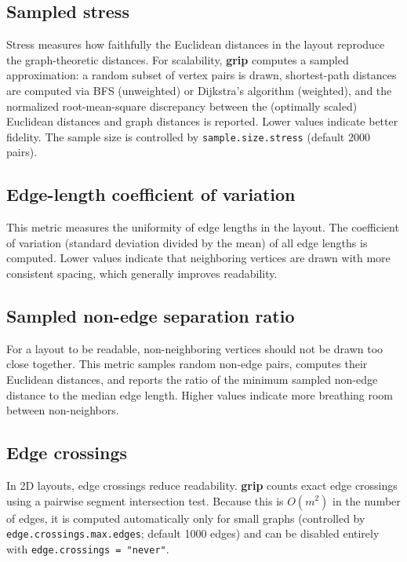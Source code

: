 \subsection{Sampled stress}\label{sampled-stress}

Stress measures how faithfully the Euclidean distances in the layout
reproduce the graph-theoretic distances. For scalability, \textbf{grip} computes a
sampled approximation: a random subset of vertex pairs is drawn, shortest-path
distances are computed via BFS (unweighted) or Dijkstra's algorithm
(weighted), and the normalized root-mean-square discrepancy between the
(optimally scaled) Euclidean distances and graph distances is reported. Lower
values indicate better fidelity. The sample size is controlled by
\texttt{sample.size.stress} (default 2000 pairs).

\subsection{Edge-length coefficient of variation}\label{edge-length-coefficient-of-variation}

This metric measures the uniformity of edge lengths in the layout. The
coefficient of variation (standard deviation divided by the mean) of all edge
lengths is computed. Lower values indicate that neighboring vertices are
drawn with more consistent spacing, which generally improves readability.

\subsection{Sampled non-edge separation ratio}\label{sampled-non-edge-separation-ratio}

For a layout to be readable, non-neighboring vertices should not be drawn
too close together. This metric samples random non-edge pairs, computes
their Euclidean distances, and reports the ratio of the minimum sampled
non-edge distance to the median edge length. Higher values indicate more
breathing room between non-neighbors.

\subsection{Edge crossings}\label{edge-crossings}

In 2D layouts, edge crossings reduce readability. \textbf{grip} counts exact edge
crossings using a pairwise segment intersection test. Because this is
\(O(m^2)\) in the number of edges, it is computed automatically only for
small graphs (controlled by \texttt{edge.crossings.max.edges}; default 1000 edges)
and can be disabled entirely with \texttt{edge.crossings\ =\ "never"}.

